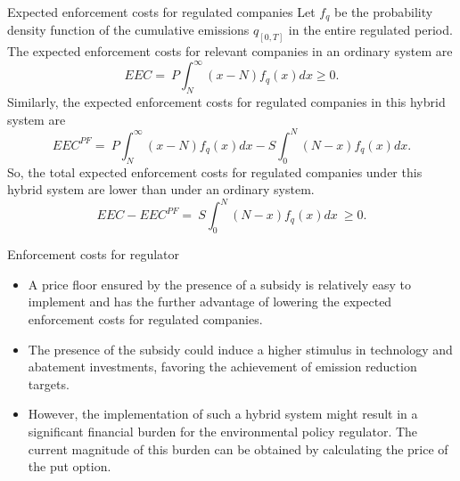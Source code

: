 {Expected enforcement costs for regulated companies}
 Let $f_q$ be the probability density function of the cumulative emissions $q_{[0,T]}$ in the entire regulated period. The expected enforcement costs for relevant companies in an ordinary system are
$$
EEC = \ P \int_N^{\infty} (x-N) f_q(x) dx \ge 0.
$$
Similarly, the expected enforcement costs for regulated companies in this hybrid system are
$$
EEC^{PF} = \ P \int_N^{\infty} (x-N) f_q(x) dx - S \int_0^N (N-x) f_q(x) dx.
$$
So, the total expected enforcement costs for regulated companies under this hybrid system are lower than under an ordinary system.
$$
EEC - EEC^{PF} = \ S \int_0^N (N-x) f_q(x) dx \ \ge 0.
$$



{Enforcement costs for regulator}
\begin{itemize}
\item<1-> A price floor ensured by the presence of a subsidy is relatively easy to implement and has the further advantage of lowering the expected enforcement costs for regulated companies.
\item<2-> The presence of the subsidy could induce a higher stimulus in technology and abatement investments, favoring the achievement of emission reduction targets.
\item<3-> However, the implementation of such a hybrid system might result in a significant financial burden for the environmental policy regulator. The current magnitude of this burden can be obtained by calculating the price of the put option.
\end{itemize}




